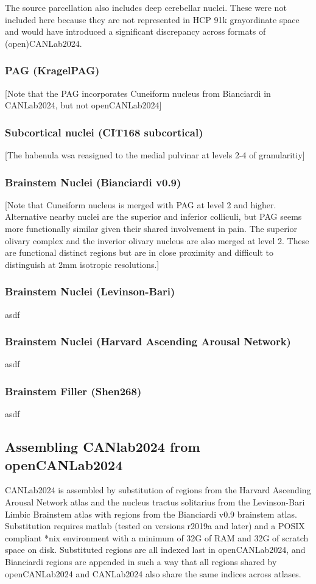 \documentclass[10pt,letterpaper]{article}
\begin{document}
The source parcellation  also includes deep cerebellar nuclei. These were not included here because they are not represented in HCP 91k grayordinate space and would have introduced a significant discrepancy across  formats of (open)CANLab2024.
\\
\subsubsection{PAG (KragelPAG)} [Note that the PAG incorporates Cuneiform nucleus from Bianciardi in CANLab2024, but not openCANLab2024]
\\
\subsubsection{Subcortical nuclei (CIT168 subcortical)} [The habenula wsa reasigned to the medial pulvinar at levels 2-4 of granularitiy]
\\
\subsubsection{Brainstem Nuclei (Bianciardi v0.9)} [Note that Cuneiform nucleus is merged with PAG at level 2 and higher. Alternative nearby nuclei are the superior and inferior colliculi, but PAG seems more functionally similar given their shared involvement in pain. The superior olivary complex and the inverior olivary nucleus are also merged at level 2. These are functional distinct regions but are in close proximity and difficult to distinguish at 2mm isotropic resolutions.]
\\
\subsubsection{Brainstem Nuclei (Levinson-Bari)} asdf
\\
\subsubsection{Brainstem Nuclei (Harvard Ascending Arousal Network)} asdf
\\
\subsubsection{Brainstem Filler (Shen268)} asdf
\\
\subsection{Assembling CANlab2024 from openCANLab2024}
CANLab2024 is assembled by substitution of regions from the Harvard Ascending Arousal Network atlas and the nucleus tractus solitarius from the Levinson-Bari Limbic Brainstem atlas with regions from the Bianciardi v0.9 brainstem atlas. Substitution requires matlab (tested on versions r2019a and later) and a POSIX compliant *nix environment with a minimum of 32G of RAM and 32G of scratch space on disk. Substituted regions are all indexed last in openCANLab2024, and Bianciardi regions are appended in such a way that all regions shared by openCANLab2024 and CANLab2024 also share the same indices across atlases.
\end{document}
